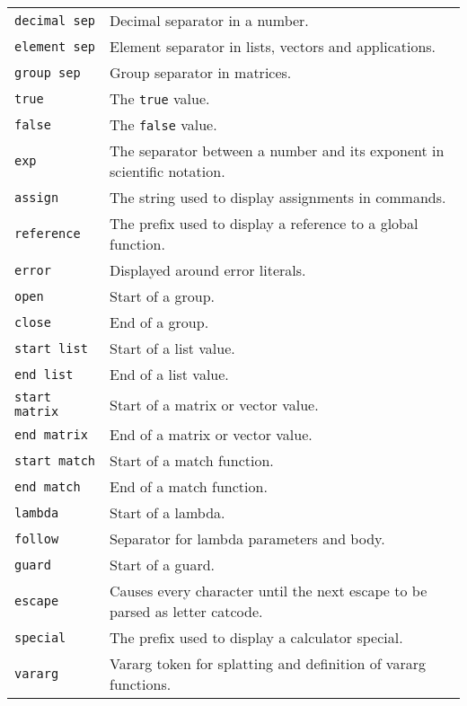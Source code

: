 \documentclass[10pt]{article}
\begin{document}
    \begin{longtable}{p{}p{}}
        \verb|decimal sep|     & Decimal separator in a number. \\
        \verb|element sep|     & Element separator in lists, vectors and applications. \\
        \verb|group sep|       & Group separator in matrices. \\
        \verb|true|            & The \verb|true| value. \\
        \verb|false|           & The \verb|false| value. \\
        \verb|exp|             & The separator between a number and its exponent in scientific notation. \\
        \verb|assign|          & The string used to display assignments in commands. \\
        \verb|reference|       & The prefix used to display a reference to a global function. \\
        \verb|error|           & Displayed around error literals. \\
        \verb|open|            & Start of a group. \\
        \verb|close|           & End of a group. \\
        \verb|start list|      & Start of a list value. \\
        \verb|end list|        & End of a list value. \\
        \verb|start matrix|    & Start of a matrix or vector value. \\
        \verb|end matrix|      & End of a matrix or vector value. \\
        \verb|start match|     & Start of a match function. \\
        \verb|end match|       & End of a match function. \\
        \verb|lambda|          & Start of a lambda. \\
        \verb|follow|          & Separator for lambda parameters and body. \\
        \verb|guard |          & Start of a guard. \\
        \verb|escape|          & Causes every character until the next escape to be parsed as letter catcode. \\
        \verb|special|         & The prefix used to display a calculator special. \\
        \verb|vararg|          & Vararg token for splatting and definition of vararg functions. \\

\end{longtable}
\end{document}

